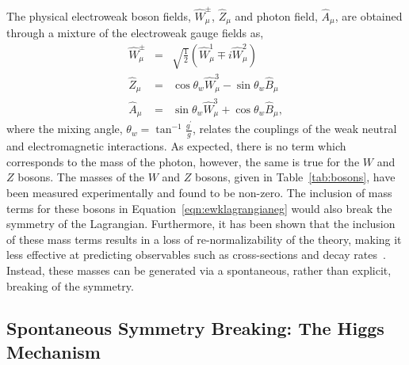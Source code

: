 The physical electroweak boson fields, $\hat{W}_{\mu}^{\pm}$, $\hat{Z}_{\mu}$ and photon field, 
$\hat{A}_{\mu}$, are obtained through a mixture of the electroweak gauge fields as,
\begin{eqnarray}
\hat{W}_{\mu}^{\pm} & = &  \sqrt{\frac{1}{2}} \left( \hat{W}_{\mu}^{1} \mp i \hat{W}_{\mu}^{2} \right) \nonumber \\
\hat{Z}_{\mu} &  = & \cos\theta_{w} \hat{W}_{\mu}^{3} - \sin\theta_{w} \hat{B}_{\mu} \nonumber \\
\hat{A}_{\mu} &  = & \sin\theta_{w} \hat{W}_{\mu}^{3} + \cos\theta_{w} \hat{B}_{\mu},
\label{eqn:ewkbosons}
\end{eqnarray}
where the mixing angle, $\theta_{w} = \tan^{-1}{\frac{g^{\prime}}{g}}$, relates
the couplings of the weak neutral and electromagnetic interactions.
As expected, there is no term which corresponds to the mass of the photon, however,
the same is true for the $W$ and $Z$ bosons. The masses of the $W$ and $Z$ bosons, 
given in Table~\ref{tab:bosons}, have been measured experimentally and found to be 
non-zero. The inclusion of mass terms for these bosons in Equation~\ref{eqn:ewklagrangianeg} 
would also break the symmetry of the Lagrangian. Furthermore, it has been shown that the inclusion
of these mass terms results in a loss of re-normalizability of the theory, making it  
less effective at predicting observables such as cross-sections and decay rates~\citep{halzen}.
Instead, these masses can be generated via a spontaneous, rather than explicit, 
breaking of the symmetry.

\subsection{Spontaneous Symmetry Breaking: The Higgs Mechanism}

